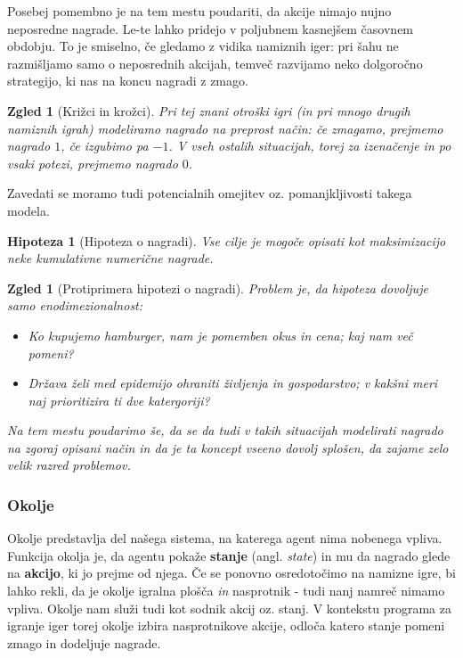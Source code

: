 \documentclass[12pt,a4paper]{amsart}
\theoremstyle{definition} %
\theoremstyle{plain} %
\newtheorem{zgled}[definicija]{Zgled}
\newtheorem{hipoteza}[definicija]{Hipoteza}
\begin{document}
Posebej pomembno je na tem mestu poudariti, da akcije nimajo nujno neposredne nagrade. Le-te 
lahko pridejo v poljubnem kasnejšem časovnem obdobju. To je smiselno, če gledamo z vidika 
namiznih iger: pri šahu ne razmišljamo samo o neposrednih akcijah, temveč razvijamo neko 
dolgoročno strategijo, ki nas na koncu nagradi z zmago. 

\begin{zgled}[Križci in krožci]
    Pri tej znani otroški igri (in pri mnogo drugih namiznih igrah) modeliramo nagrado na 
    preprost način: če zmagamo, prejmemo nagrado $1$, če izgubimo pa $-1$. V vseh ostalih 
    situacijah, torej za izenačenje in po vsaki potezi, prejmemo nagrado $0$.
\end{zgled}

Zavedati se moramo tudi potencialnih omejitev oz. pomanjkljivosti takega modela. 
\begin{hipoteza}[Hipoteza o nagradi]
    Vse cilje je mogoče opisati kot maksimizacijo neke kumulativne numerične 
    nagrade.
\end{hipoteza}

\begin{zgled}[Protiprimera hipotezi o nagradi]
    Problem je, da hipoteza dovoljuje samo enodimezionalnost:
    \begin{itemize}
        \item Ko kupujemo hamburger, nam je pomemben okus in cena; kaj nam več pomeni?
        \item Država želi med epidemijo ohraniti življenja in gospodarstvo; v kakšni 
                meri naj prioritizira ti dve katergoriji?
    \end{itemize}
    Na tem mestu poudarimo še, da se da tudi v takih situacijah modelirati nagrado na zgoraj 
    opisani način in da je ta koncept vseeno dovolj splošen, da zajame zelo velik razred problemov.
    
\end{zgled}

\subsubsection{Okolje}
Okolje predstavlja del našega sistema, na katerega agent nima nobenega vpliva. Funkcija okolja
je, da agentu pokaže \textbf{stanje} (angl. \textit{state}) in mu da nagrado glede na 
\textbf{akcijo}, ki jo prejme od njega. Če se ponovno osredotočimo na namizne igre, bi lahko rekli, 
da je okolje igralna plošča \textit{in} nasprotnik  - tudi nanj namreč nimamo vpliva. Okolje nam 
služi tudi kot sodnik akcij oz. stanj. V kontekstu programa za igranje iger torej okolje izbira 
nasprotnikove akcije, odloča katero stanje pomeni zmago in dodeljuje nagrade.
\end{document}
